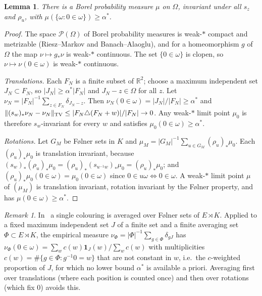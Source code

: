 \documentclass[11pt]{amsart}
\newtheorem{lemma}[theorem]{Lemma}
\theoremstyle{definition}
\theoremstyle{remark}
\newtheorem{remark}[theorem]{Remark}
\newcommand{\R}{\mathbb{R}}
\newcommand{\one}{\mathbf 1}
\begin{document}
\begin{lemma}\label{lem:inv}
There is a Borel probability measure $\mu$ on $\Omega$, invariant under all $s_z$ and $\rho_u$, with $\mu(\{\omega:0\in\omega\})\ge\alpha^*$.
\end{lemma}

\begin{proof}
The space $\mathcal P(\Omega)$ of Borel probability measures is weak-$*$ compact and metrizable (Riesz--Markov and Banach--Alaoglu), and for a homeomorphism $g$ of $\Omega$ the map $\nu\mapsto g_*\nu$ is weak-$*$ continuous. The set $\{0\in\omega\}$ is clopen, so $\nu\mapsto\nu(0\in\omega)$ is weak-$*$ continuous.

\emph{Translations.} Each $F_N$ is a finite subset of $\R^2$; choose a maximum independent set $J_N\subset F_N$, so $|J_N|\ge\alpha^*|F_N|$ and $J_N-z\in\Omega$ for all $z$. Let $\nu_N=|F_N|^{-1}\sum_{z\in F_N}\delta_{J_N-z}$. Then $\nu_N(0\in\omega)=|J_N|/|F_N|\ge\alpha^*$ and $\|(s_w)_*\nu_N-\nu_N\|_{\rm TV}\le|F_N\triangle(F_N+w)|/|F_N|\to0$. Any weak-$*$ limit point $\mu_0$ is therefore $s_w$-invariant for every $w$ and satisfies $\mu_0(0\in\omega)\ge\alpha^*$.

\emph{Rotations.} Let $G_M$ be Følner sets in $K$ and $\mu_M=|G_M|^{-1}\sum_{u\in G_M}(\rho_u)_*\mu_0$. Each $(\rho_u)_*\mu_0$ is translation invariant, because $(s_w)_*(\rho_u)_*\mu_0=(\rho_u)_*(s_{u^{-1}w})_*\mu_0=(\rho_u)_*\mu_0$; and $(\rho_u)_*\mu_0(0\in\omega)=\mu_0(0\in\omega)$ since $0\in u\omega\iff0\in\omega$. A weak-$*$ limit point $\mu$ of $(\mu_M)$ is translation invariant, rotation invariant by the Følner property, and has $\mu(0\in\omega)\ge\alpha^*$.
\end{proof}

\begin{remark}\label{rem:weights}
In~\cite[Prop.~4.2]{OAI} a single colouring is averaged over Følner sets of $E\rtimes K$. Applied to a fixed maximum independent set $J$ of a finite set and a finite averaging set $\Phi\subset E\rtimes K$, the empirical measure $\nu_\Phi=|\Phi|^{-1}\sum_{g\in\Phi}\delta_{gJ}$ has $\nu_\Phi(0\in\omega)=\sum_wc(w)\one_J(w)/\sum_wc(w)$ with multiplicities $c(w)=\#\{g\in\Phi:g^{-1}0=w\}$ that are not constant in $w$, i.e.\ the $c$-weighted proportion of $J$, for which no lower bound $\alpha^*$ is available a priori. Averaging first over translations (where each position is counted once) and then over rotations (which fix $0$) avoids this.
\end{remark}
\end{document}
